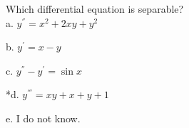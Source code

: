 
Which differential equation is separable? \\


a. \( y^{''} = x^{2} + 2xy + y^{2} \)

b. \( y^{'} = x - y \)

c. \( y^{''} - y^{'} = \sin x \)

*d. \( y^{'''} = xy + x + y + 1 \)

e. I do not know. \\
